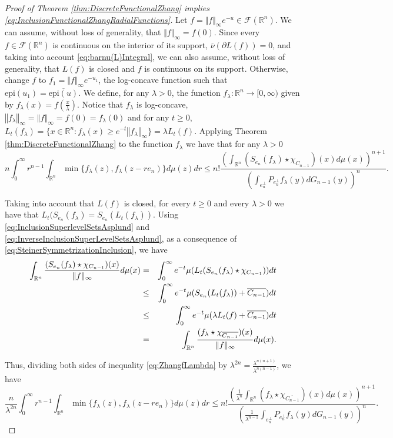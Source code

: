\documentclass{amsart}
\newcommand{\R}{\mathbb R}
\newcommand{\norma}[1]{\left\Vert#1\right\Vert}
\theoremstyle{remark}
\theoremstyle{definition}
\numberwithin{equation}{section}
\begin{document}
\begin{proof}[Proof of Theorem \ref{thm:DiscreteFunctionalZhang} implies \eqref{eq:InclusionFunctionalZhangRadialFunctions}]

Let $f=\Vert f\Vert_{\infty} e^{-u}\in\mathcal{F}(\R^n)$. We can assume, without loss of generality, that $\Vert f\Vert_\infty=f(0)$. Since every $f\in\mathcal{F}(\R^n)$ is continuous on the interior of its support, $\overline{\nu}(\partial L(f))=0$, and taking into account \eqref{eq:barnu(L)Integral}, we can also assume, without loss of generality, that $L(f)$ is closed and $f$ is continuous on its support. Otherwise, change $f$ to $f_1=\Vert f\Vert_\infty e^{-u_1}$, the log-concave function such that $\textrm{epi}(u_1)=\overline{\textrm{epi}(u)}$. We define, for any $\lambda>0$, the function $f_\lambda \colon \R^n \to [0, \infty)$ given by $f_\lambda(x)=f\left( \frac{x}{\lambda} \right)$. Notice that $f_\lambda$ is log-concave, $\norma{f_\lambda}_{\infty}=\norma{f}_{\infty}=f(0)=f_\lambda(0)$ and for any $t \geq 0$, $L_t(f_\lambda)=\{ x \in \R^n : f_\lambda(x) \geq e^{-t} \norma{f_\lambda}_{\infty} \}=\lambda L_t(f).$ Applying Theorem \ref{thm:DiscreteFunctionalZhang} to the function $f_\lambda$ we have that for any $\lambda>0$
\begin{equation}\label{eq:ZhangfLambda}
n\int_0^\infty r^{n-1}\int_{\R^n}\min\{f_\lambda(z),f_\lambda(z-re_n)\}d\mu(z)dr\leq n!\frac{\left(\int_{\R^n}(S_{e_n}(f_\lambda)\star\chi_{C_{n-1}})(x)d\mu(x)\right)^{n+1}}{\left(\int_{e_n^\perp}P_{e_n^\perp}f_\lambda(y)dG_{n-1}(y)\right)^n}.
\end{equation}


Taking into account that $L(f)$ is closed, for every $t\geq0$ and every $\lambda>0$ we have that $L_t(S_{e_n} (f_\lambda)=S_{e_n}(L_t(f_\lambda))$. Using \eqref{eq:InclusionSuperlevelSetsAsplund} and \eqref{eq:InverseInclusionSuperLevelSetsAsplund}, as a consequence of \eqref{eq:SteinerSymmetrizationInclusion}, we have
\begin{eqnarray*}
\int_{\R^n}\frac{(S_{e_n}(f_\lambda)\star\chi_{C_{n-1}})(x)}{\Vert f\Vert_\infty}d\mu(x)&=&\int_0^{\infty} e^{-t} \mu(L_t(S_{e_n} (f_\lambda)\star\chi_{C_{n-1}})) dt \cr
&\leq&\int_0^{\infty} e^{-t} \mu(S_{e_n}(L_t(f_\lambda))+\overline{C_{n-1}}) dt \cr
&\leq& \int_0^{\infty} e^{-t} \mu(\lambda L_t(f) + \overline{C_{n-1}}) dt\cr
&=&\int_{\R^n}\frac{(f_\lambda\star\chi_{\overline{C_{n-1}}})(x)}{\Vert f\Vert_\infty}d\mu(x).
\end{eqnarray*}

Thus, dividing both sides of inequality \eqref{eq:ZhangfLambda} by $\lambda^{2n}=\frac{\lambda^{n(n+1)}}{\lambda^{n(n-1)}}$, we have
\begin{equation}\label{eq:first_application_zhang}
\frac{n}{\lambda^{2n}}\int_0^\infty r^{n-1}\int_{\R^n}\min\{f_\lambda(z),f_\lambda(z-re_n)\}d\mu(z)dr\leq n!\frac{\left(\frac{1}{\lambda^n}\int_{\R^n}(f_\lambda\star\chi_{\overline{C_{n-1}}})(x)d\mu(x)\right)^{n+1}}{\left(\frac{1}{\lambda^{n-1}}\int_{e_n^\perp}P_{e_n^\perp}f_\lambda(y)dG_{n-1}(y)\right)^n}.
\end{equation}


\end{proof}
\end{document}
